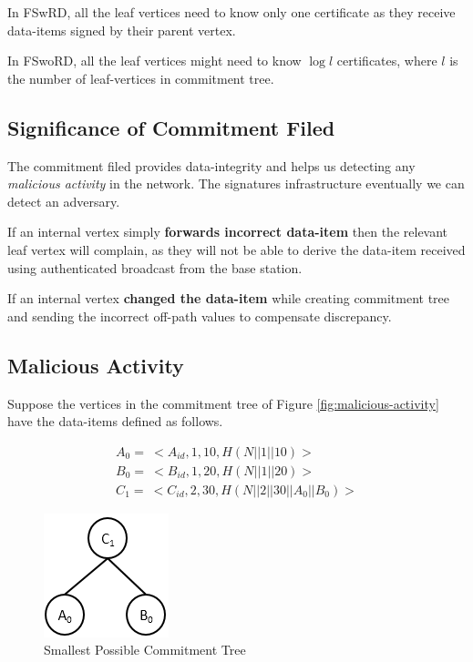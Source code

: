 \documentclass[%
  slidesonly,%
  semlayer%
  ]{seminar}                                  %
\begin{document}
\begin{slide}
        In FSwRD, all the leaf vertices need to know only one certificate as they receive data-items signed by their parent vertex.

        In FSwoRD, all the leaf vertices might need to know $\log l$ certificates, where $l$ is the number of leaf-vertices in commitment tree.
        \clearpage

      \subsection*{Significance of Commitment Filed}

        The commitment filed provides data-integrity and helps us detecting any \textit{malicious activity} in the network. 
        The signatures infrastructure eventually we can detect an adversary. 

        If an internal vertex simply \textbf{forwards incorrect data-item} then the relevant leaf vertex will complain, as they will not be able to derive the data-item received using authenticated broadcast from the base station.
        
        If an internal vertex \textbf{changed the data-item} while creating commitment tree and sending the incorrect off-path values to compensate discrepancy. 
        \clearpage

      \subsection*{Malicious Activity}

        Suppose the vertices in the commitment tree of Figure \ref{fig:malicious-activity} have the data-items defined as follows.
        
        \begin{equation*}
          \begin{array}{l}
            A_{0} =\ <A_{id},1,10, H(N||1||10)>\\
            B_{0} =\ <B_{id},1,20, H(N||1||20)>\\
            C_{1} =\ <C_{id},2,30, H(N||2||30||A_{0}||B_{0})>
          \end{array}
        \end{equation*}

        \begin{figure}[t]
          \centering
          \includegraphics[scale=0.5]{images/commitment-tree-2.png}
          \caption{Smallest Possible Commitment Tree}
        \end{figure}


\end{slide}
\end{document}
